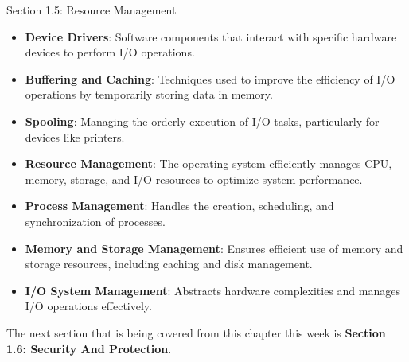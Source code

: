 \begin{notes}{Section 1.5: Resource Management}
    \begin{highlight}
    
    \begin{itemize}
        \item \textbf{Device Drivers}: Software components that interact with specific hardware devices to perform I/O operations.
        \item \textbf{Buffering and Caching}: Techniques used to improve the efficiency of I/O operations by temporarily storing data in memory.
        \item \textbf{Spooling}: Managing the orderly execution of I/O tasks, particularly for devices like printers.
    \end{itemize}
    
    \end{highlight}
    
    \begin{highlight}
    
    \begin{itemize}
        \item \textbf{Resource Management}: The operating system efficiently manages CPU, memory, storage, and I/O resources to optimize system performance.
        \item \textbf{Process Management}: Handles the creation, scheduling, and synchronization of processes.
        \item \textbf{Memory and Storage Management}: Ensures efficient use of memory and storage resources, including caching and disk management.
        \item \textbf{I/O System Management}: Abstracts hardware complexities and manages I/O operations effectively.
    \end{itemize}
    
    \end{highlight}
\end{notes}

The next section that is being covered from this chapter this week is \textbf{Section 1.6: Security And Protection}.

